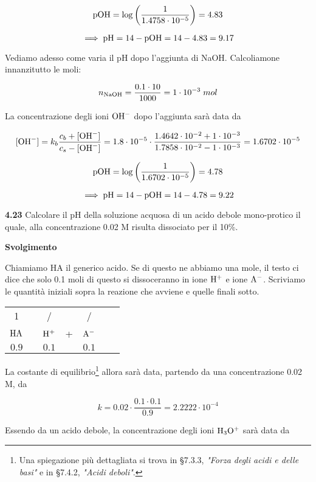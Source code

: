 $$\rm pOH=\log \left( \frac{1}{1.4758 \cdot 10^{-5}} \right)=4.83$$

$$\implies \rm pH=14-pOH=14-4.83=9.17$$

Vediamo adesso come varia il pH dopo l'aggiunta di NaOH. Calcoliamone innanzitutto le moli:

$$n_{\rm NaOH}=\frac{0.1 \cdot 10}{1000}=1 \cdot 10^{-3}\;mol$$

La concentrazione degli ioni $\rm OH^-$ dopo l'aggiunta sarà data da

$${[\text{OH}^-]}=k_b \frac{c_b + {[\text{OH}^-]}}{c_s - \rm{[\text{OH}^-]}}
=1.8 \cdot 10^{-5} \cdot \frac{1.4642 \cdot 10^{-2} + 1 \cdot 10^{-3}}{1.7858 \cdot 10^{-2} - 1 \cdot 10^{-3}}=1.6702 \cdot 10^{-5}$$

$$\rm pOH=\log \left( \frac{1}{1.6702 \cdot 10^{-5}} \right)=4.78$$

$$\implies \rm pH=14-pOH=14-4.78=9.22$$

\vspace{0.2cm}\textbf{4.23} Calcolare il pH della soluzione acquosa di un acido debole mono-protico il quale, alla concentrazione 0.02 M risulta dissociato per il 10\%.

\vspace{0.2cm}\large\textbf{Svolgimento}\normalsize

\vspace{0.2cm} Chiamiamo HA il generico acido. Se di questo ne abbiamo una mole, il testo ci dice che solo 0.1 moli di questo si dissoceranno in ione $\rm H^+$ e ione $\rm A^-$. Scriviamo le quantità iniziali sopra la reazione che avviene e quelle finali sotto.

\begin{center}
    \begin{tabular}{ccccccc}
        1 & & / & & /\\
        $\rm HA$ & \ce{<-->} & $\rm H^+$ & + & $\rm A^-$\\
        $0.9$ & & $0.1$ & & $0.1$\\
    \end{tabular}
\end{center}

La costante di equilibrio\footnote{Una spiegazione più dettagliata si trova in §7.3.3, \textit{"Forza degli acidi e delle basi"} e in §7.4.2, \textit{"Acidi deboli"}.} allora sarà data, partendo da una concentrazione 0.02 M, da

$$k=0.02 \cdot \frac{0.1 \cdot 0.1}{0.9}=2.2222 \cdot 10^{-4}$$

Essendo da un acido debole, la concentrazione degli ioni $\rm H_3O^+$ sarà data da

